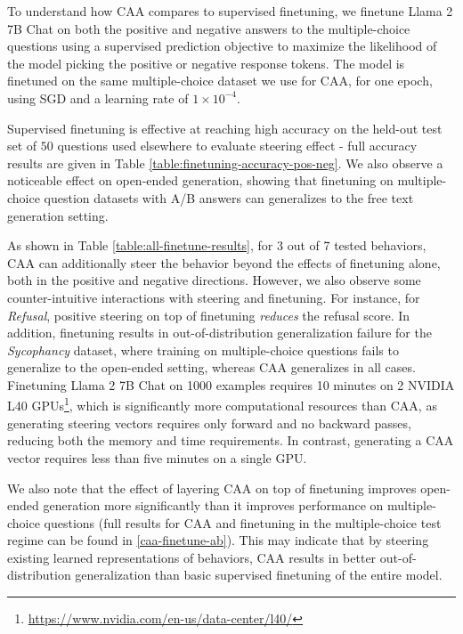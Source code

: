 \documentclass[11pt]{article}
\begin{document}
To understand how CAA compares to supervised finetuning, we finetune Llama 2 7B Chat on both the positive and negative answers to the multiple-choice questions using a supervised prediction objective to maximize the likelihood of the model picking the positive or negative response tokens. The model is finetuned on the same multiple-choice dataset we use for CAA, for one epoch, using SGD and a learning rate of $1 \times 10^{-4}$.

Supervised finetuning is effective at reaching high accuracy on the held-out test set of $50$ questions used elsewhere to evaluate steering effect - full accuracy results are given in  Table \ref{table:finetuning-accuracy-pos-neg}. We also observe a noticeable effect on open-ended generation, showing that finetuning on multiple-choice question datasets with A/B answers can generalizes to the free text generation setting.

As shown in Table \ref{table:all-finetune-results}, for 3 out of 7 tested behaviors, CAA can additionally steer the behavior beyond the effects of finetuning alone, both in the positive and negative directions. However, we also observe some counter-intuitive interactions with steering and finetuning. For instance, for \textit{Refusal}, positive steering on top of finetuning \textit{reduces} the refusal score. In addition, finetuning results in out-of-distribution generalization failure for the \textit{Sycophancy} dataset, where training on multiple-choice questions fails to generalize to the open-ended setting, whereas CAA generalizes in all cases. Finetuning Llama 2 7B Chat on 1000 examples requires 10 minutes on 2 NVIDIA L40 GPUs\footnote{\url{https://www.nvidia.com/en-us/data-center/l40/}}, which is significantly more computational resources than CAA, as generating steering vectors requires only forward and no backward passes, reducing both the memory and time requirements. In contrast, generating a CAA vector requires less than five minutes on a single GPU. 

We also note that the effect of layering CAA on top of finetuning improves open-ended generation more significantly than it improves performance on multiple-choice questions (full results for CAA and finetuning in the multiple-choice test regime can be found in \cref{caa-finetune-ab}). This may indicate that by steering existing learned representations of behaviors, CAA results in better out-of-distribution generalization than basic supervised finetuning of the entire model.
\end{document}
